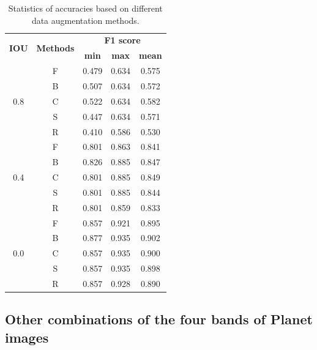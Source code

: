 \documentclass[authoryear,preprint,review,12pt]{elsarticle}
\begin{document}
\begin{table}[ht]
\centering
\footnotesize
\caption{Statistics of accuracies based on different data augmentation methods.}
\label{table_stastic_imgaug}
\begin{tabular}{c c c c  c  }
\toprule
\multirow{2}{*}{\textbf{IOU}}&\multirow{2}{*}{\textbf{Methods}}& \multicolumn{3}{c}{ \textbf{F1 score}} \\
 & &\textbf{min}&\textbf{max}&\textbf{mean}\\
\midrule
\multirow{5}{*}{0.8} & F &     0.479 & 0.634 & 0.575 \\
&      B & 0.507 & 0.634 & 0.572 \\
&      C & 0.522 & 0.634 & 0.582 \\
&      S & 0.447 & 0.634 & 0.571 \\
&      R & 0.410 & 0.586 & 0.530 \\

\midrule
\multirow{5}{*}{0.4}&      F & 0.801 & 0.863 & 0.841 \\
&      B & 0.826 & 0.885 & 0.847 \\
&      C & 0.801 & 0.885 & 0.849 \\
&      S & 0.801 & 0.885 & 0.844 \\
&      R & 0.801 & 0.859 & 0.833 \\

\midrule
\multirow{5}{*}{0.0} &     F & 0.857 & 0.921 & 0.895 \\
&      B & 0.877 & 0.935 & 0.902 \\
&      C & 0.857 & 0.935 & 0.900 \\
&      S & 0.857 & 0.935 & 0.898 \\
&      R & 0.857 & 0.928 & 0.890 \\


\bottomrule
\end{tabular}
\end{table}

\subsection{Other combinations of the four bands of Planet images}
\label{subsec_otherbands}
\end{document}
